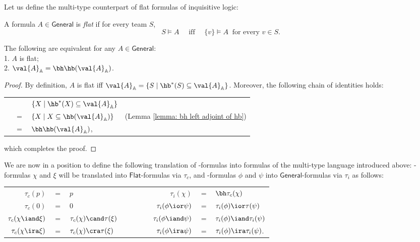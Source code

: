 Let us define the multi-type counterpart of flat formulas of  inquisitive logic: 
\begin{definition}
A formula $A\in \mathsf{General}$ is {\em flat} if for every team $S$, \[S\models A \quad \mbox{ iff }\quad \{v\}\models A\ \mbox{ for every } v\in S.\]
\end{definition}  
\begin{lemma}
\label{lemma:semantic flatness}
The following are equivalent for any $A\in \mathsf{General}$:\\
1. $A$ is flat;\\
2. $\val{A}_{\mathbb{A}} = \bh \hb(\val{A}_{\mathbb{A}})$.
\end{lemma}
\begin{proof}
By definition, $A$ is flat iff  $\val{A}_{\mathbb{A}} = \{S\mid \hb^{\ast}(S)\subseteq \val{A}_{\mathbb{A}}\}$.
Moreover, the following chain of identities holds:
\begin{center}
\begin{tabular}{r c l l}
& & $\{X\mid \hb^{\ast}(X)\subseteq \val{A}_{\mathbb{A}}\}$\\
&$=$ & $\{X\mid X\subseteq \hb(\val{A}_{\mathbb{A}})\}$ & (Lemma \ref{lemma: bh left adjoint of hb})\\
&$=$ & $\bh \hb(\val{A}_{\mathbb{A}})$,\\
\end{tabular}
\end{center}
which completes the proof.
\end{proof}

We are now in a position to define the following translation of \Inql-formulas into formulas of the multi-type language introduced above:
\CPC-formulas $\chi$ and $\xi$ will be translated into $\mathsf{Flat}$-formulas via $\tau_c$, and \Inql-formulas $\phi$ and $\psi$ into $\mathsf{General}$-formulas via $\tau_i$ as follows:

\begin{center}
\begin{tabular}{r c l c r c l}
$\tau_c(p)$ &$=$& $p$ &$\quad\quad \quad$& $\tau_i(\chi)$ &$=$& $\bh\tau_c(\chi)$\\
$\tau_c(0)$ &$=$& $0$ && $\tau_i(\phi\ior \psi)$ &$=$& $\tau_i(\phi)\ior\tau(\psi)$\\
$\tau_c(\chi\iand \xi)$ &$=$& $\tau_c(\chi)\cand\tau(\xi)$ && $\tau_i(\phi\iand \psi)$ &$=$& $\tau_i(\phi)\iand\tau_i(\psi)$ \\
$\tau_c(\chi\ira \xi)$ &$=$& $\tau_c(\chi)\cra\tau(\xi)$ && $\tau_i(\phi\ira \psi)$ &$=$& $\tau_i(\phi)\ira\tau_i(\psi)$. \\
\end{tabular}
\end{center}


